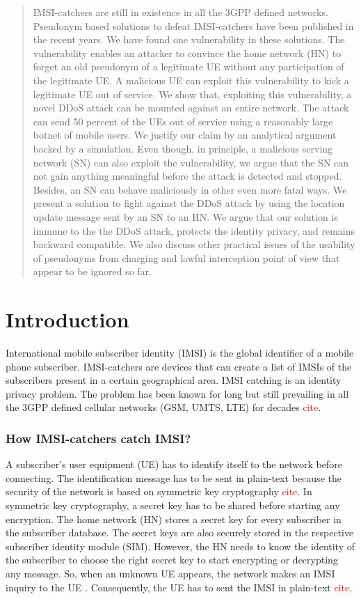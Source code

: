 \documentclass{llncs} %
\begin{document}
\begin{abstract}
IMSI-catchers are still in existence in all the 3GPP defined networks. Pseudonym based solutions to defeat IMSI-catchers have been published in the recent years. We have found one vulnerability in these solutions. The vulnerability enables an attacker to convince the home network (HN) to forget an old pseudonym of a legitimate UE without any participation of the legitimate UE. A malicious UE can exploit this vulnerability to kick a legitimate UE out of service. We show that, exploiting this vulnerability, a novel DDoS attack can be mounted against an entire network. The attack can send 50 percent of the UEs out of service using a reasonably large botnet of mobile users. We justify our claim by an analytical argument backed by a simulation. Even though, in principle, a malicious serving network (SN) can also exploit the vulnerability, we argue that the SN can not gain anything meaningful before the attack is detected and stopped. Besides, an SN can behave maliciously in other even more fatal ways. We present a solution to fight against the DDoS attack by using the location update message sent by an SN to an HN. We argue that our solution is immune to the the DDoS attack, protects the identity privacy, and remains backward compatible. We also discuss other practical issues of the usability of pseudonyms from charging and lawful interception point of view that appear to be ignored so far.
\end{abstract}


\section{Introduction} \label{intro}
International mobile subscriber identity (IMSI) is the global identifier of a mobile phone subscriber. IMSI-catchers are devices that can create a list of IMSIs of the subscribers present in a certain geographical area. IMSI catching is an identity privacy problem. The problem has been known for long but still prevailing in all the 3GPP defined cellular networks (GSM, UMTS, LTE) for decades \textcolor{red}{cite}. 

\subsubsection{How IMSI-catchers catch IMSI?} A subscriber's user equipment (UE) has to identify itself to the network before connecting. The identification message has to be sent in plain-text because the security of the network is based on symmetric key cryptography \textcolor{red}{cite}. In symmetric key cryptography, a secret key has to be shared before starting any encryption. The home network (HN) stores a secret key for every subscriber in the subscriber database. The secret keys are also securely stored in the respective subscriber identity module (SIM). However, the HN needs to know the identity of the subscriber to choose the right secret key to start encrypting or decrypting any message. So, when an unknown UE appears, the network makes an IMSI inquiry to the UE . Consequently, the UE has to sent the IMSI in plain-text \textcolor{red}{cite}. 
\end{document}
